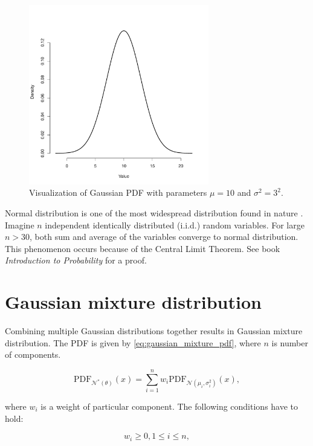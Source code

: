 \documentclass[thesis=B,english]{FITthesis}[2012/06/26]
\begin{document}
\begin{figure}
	\centering
 	\includegraphics[width=0.7\textwidth]{gaussian}
 	\caption{Visualization of Gaussian PDF with parameters $\mu=10$ and $\sigma^2=3^2$.}
 	\label{fig:gaussian}
\end{figure}

Normal distribution is one of the most widespread distribution found in nature \cite{gaussian-distribution-widespread}. Imagine $n$ independent identically distributed (i.i.d.) random variables. For large $n > 30$, both sum and average of the variables converge to normal distribution. This phenomenon occurs because of the Central Limit Theorem. See book \textit{Introduction to Probability} \cite{clt-proof} for a proof.

\section{Gaussian mixture distribution}

Combining multiple Gaussian distributions together results in Gaussian mixture distribution. The PDF is given by \ref{eq:gaussian_mixture_pdf}, where $n$ is number of components.

\begin{equation} \label{eq:gaussian_mixture_pdf}
\text{PDF}_{\mathcal{N}^*(\theta)}(x) = \sum_{i=1}^n w_i \text{PDF}_{\mathcal{N}(\mu_i,\sigma^2_i)}(x),
\end{equation}

where $w_i$ is a weight of particular component. The following conditions have to hold:

\begin{equation}
w_i \geq 0, 1 \leq i \leq n,
\end{equation}
\end{document}
